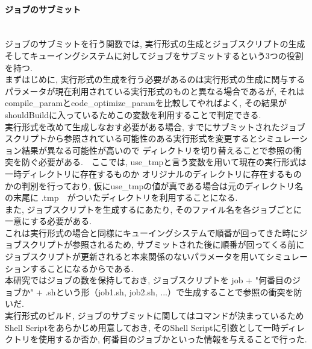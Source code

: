 \paragraph{ジョブのサブミット}~\\
ジョブのサブミットを行う関数では, 実行形式の生成とジョブスクリプトの生成そしてキューイングシステムに対してジョブをサブミットするという3つの役割を持つ.\\
まずはじめに, 実行形式の生成を行う必要があるのは実行形式の生成に関与するパラメータが現在利用されている実行形式のものと異なる場合であるが,
それはcompile\_paramとcode\_optimize\_paramを比較してやればよく, その結果がshouldBuildに入っているためこの変数を利用することで判定できる.\\
実行形式を改めて生成しなおす必要がある場合, すでにサブミットされたジョブスクリプトから参照されている可能性のある実行形式を変更するとシミュレーション結果が異なる可能性が高いので
ディレクトリを切り替えることで参照の衝突を防ぐ必要がある.　ここでは, use\_tmpと言う変数を用いて現在の実行形式は一時ディレクトリに存在するものか
オリジナルのディレクトリに存在するものかの判別を行っており, 仮にuse\_tmpの値が真である場合は元のディレクトリ名の末尾に .tmp　がついたディレクトリを利用することになる.\\

また, ジョブスクリプトを生成するにあたり, そのファイル名を各ジョブごとに一意にする必要がある.\\
これは実行形式の場合と同様にキューイングシステムで順番が回ってきた時にジョブスクリプトが参照されるため,
サブミットされた後に順番が回ってくる前にジョブスクリプトが更新されると本来関係のないパラメータを用いてシミュレーションすることになるからである.\\
本研究ではジョブの数を保持しておき, ジョブスクリプトを job + "何番目のジョブか" + .shという形（job1.sh, job2.sh, ...）で生成することで参照の衝突を防いだ.\\

実行形式のビルド, ジョブのサブミットに関してはコマンドが決まっているためShell Scriptをあらかじめ用意しておき,
そのShell Scriptに引数として一時ディレクトリを使用するか否か, 何番目のジョブかといった情報を与えることで行った.\\

